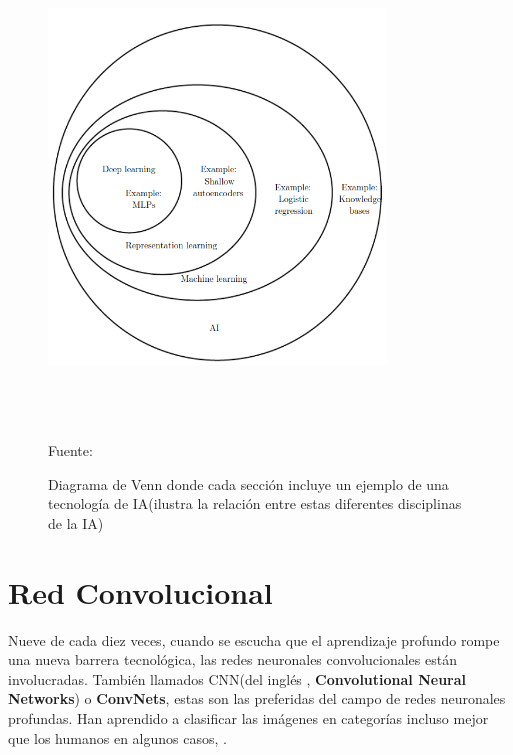 	\begin{figure}[H]
		\begin{center}
		\includegraphics[width=0.8\textwidth, height=12.5cm]{images/marcoteorico/venn_diag}
		\end{center}
		\begin{center}
		\vskip -0.1cm
		\caption{\small{Diagrama de Venn donde cada sección incluye un ejemplo de una tecnología de IA(ilustra la relación entre estas diferentes disciplinas de la IA)}}
		{\small{Fuente: \cite{Goodfellow-et-al-2016}}}
		\end{center}
		\vspace{-1.5em}
		\end{figure}

\section{Red Convolucional} 

	Nueve de cada diez veces, cuando se escucha que el aprendizaje profundo rompe una nueva barrera tecnológica, las redes neuronales convolucionales están involucradas. También llamados CNN(del inglés , {\bf Convolutional Neural Networks}) o  {\bf ConvNets}, estas son las preferidas del campo de redes neuronales profundas. Han aprendido a clasificar las imágenes en categorías incluso mejor que los humanos en algunos casos, \citep{Rohrer}.
	
